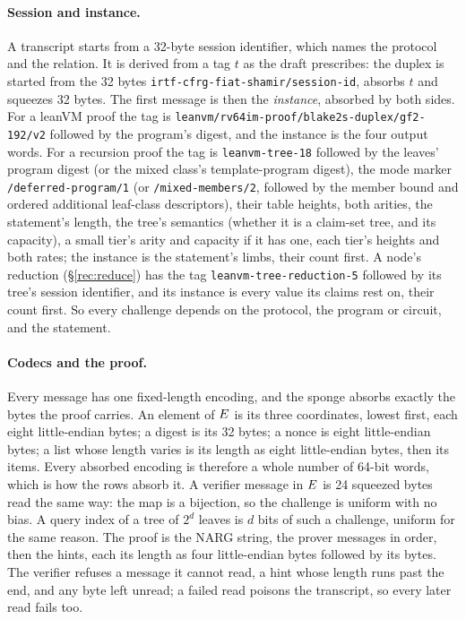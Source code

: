 \paragraph{Session and instance.} A transcript starts from a 32-byte session identifier, which names the protocol and the relation. It is derived from a tag $t$ as the draft prescribes: the duplex is started from the 32 bytes \texttt{irtf-cfrg-fiat-shamir/session-id}, absorbs $t$ and squeezes 32 bytes. The first message is then the \emph{instance}, absorbed by both sides. For a leanVM proof the tag is \texttt{leanvm/rv64im-proof/blake2s-duplex/gf2-192/v2} followed by the program's digest, and the instance is the four output words. For a recursion proof the tag is \texttt{leanvm-tree-18} followed by the leaves' program digest (or the mixed class's template-program digest), the mode marker \texttt{/deferred-program/1} (or \texttt{/mixed-members/2}, followed by the member bound and ordered additional leaf-class descriptors), their table heights, both arities, the statement's length, the tree's semantics (whether it is a claim-set tree, and its capacity), a small tier's arity and capacity if it has one, each tier's heights and both rates; the instance is the statement's limbs, their count first. A node's reduction (\S\ref{rec:reduce}) has the tag \texttt{leanvm-tree-reduction-5} followed by its tree's session identifier, and its instance is every value its claims rest on, their count first. So every challenge depends on the protocol, the program or circuit, and the statement.

\paragraph{Codecs and the proof.} Every message has one fixed-length encoding, and the sponge absorbs exactly the bytes the proof carries. An element of $E$ is its three coordinates, lowest first, each eight little-endian bytes; a digest is its 32 bytes; a nonce is eight little-endian bytes; a list whose length varies is its length as eight little-endian bytes, then its items. Every absorbed encoding is therefore a whole number of 64-bit words, which is how the rows absorb it. A verifier message in $E$ is 24 squeezed bytes read the same way: the map is a bijection, so the challenge is uniform with no bias. A query index of a tree of $2^d$ leaves is $d$ bits of such a challenge, uniform for the same reason. The proof is the NARG string, the prover messages in order, then the hints, each its length as four little-endian bytes followed by its bytes. The verifier refuses a message it cannot read, a hint whose length runs past the end, and any byte left unread; a failed read poisons the transcript, so every later read fails too.

